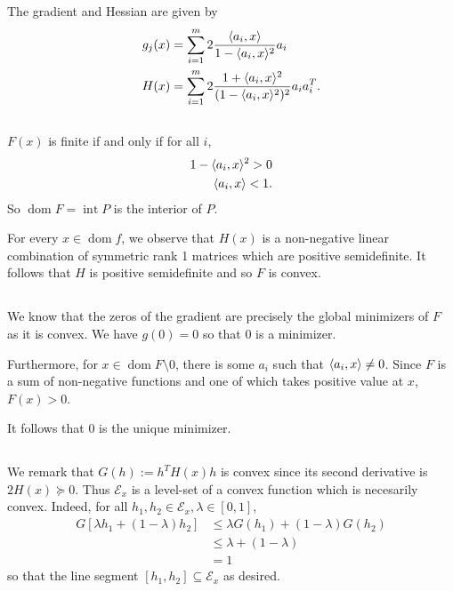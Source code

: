 \documentclass[10pt]{article}
\DeclarePairedDelimiter{\iprod}{\langle}{\rangle}
\let\abs\relax
\DeclarePairedDelimiter{\abs}{\lvert}{\rvert}
\DeclareMathOperator{\Int}{int}
\DeclareMathOperator{\dom}{dom}
\newcommand{\sset}{\subseteq}
\newcommand{\mcal}{\mathcal}
\begin{document}
\subsection{}
The gradient and Hessian are given by
\begin{align*}
  g_j(x)
  &= \sum_{i=1}^m 2\frac{\iprod{a_i, x}}{1- \iprod{a_i, x}^2}a_i \\
  H(x)
  &= \sum_{i=1}^m 2\frac{1+\iprod{a_i, x}^2}{(1-\iprod{a_i, x}^2)^2} a_ia_i^T.
\end{align*}

\subsection{}
$F(x)$ is finite if and only if for all $i$,
\begin{align*}
  1-\iprod{a_i, x}^2 > 0 \\
  \abs{\iprod{a_i, x}} < 1.
\end{align*}
So $\dom F = \Int P$ is the interior of $P$.

For every $x\in \dom f$,
we observe that $H(x)$ is a non-negative linear combination of symmetric rank 1 matrices
which are positive semidefinite.
It follows that $H$ is positive semidefinite
and so $F$ is convex.

\subsection{}
We know that the zeros of the gradient
are precisely the global minimizers of $F$ as it is convex.
We have $g(0) = 0$ so that 0 is a minimizer.

Furthermore,
for $x\in \dom F\setminus 0$,
there is some $a_i$ such that $\iprod{a_i, x}\neq 0$.
Since $F$ is a sum of non-negative functions
and one of which takes positive value at $x$,
$F(x) > 0$.

It follows that 0 is the unique minimizer.

\subsection{}
We remark that $G(h) := h^TH(x) h$ is convex since its second derivative is $2H(x)\succeq 0$.
Thus $\mcal E_x$ is a level-set of a convex function which is necesarily convex.
Indeed, for all $h_1, h_2\in \mcal E_x, \lambda\in [0, 1]$,
\begin{align*}
  G[\lambda h_1 + (1-\lambda) h_2]
  &\leq \lambda G(h_1) + (1-\lambda) G(h_2) \\
  &\leq \lambda + (1-\lambda) \\
  &= 1
\end{align*}
so that the line segment $[h_1, h_2]\sset \mcal E_x$ as desired.
\end{document}

